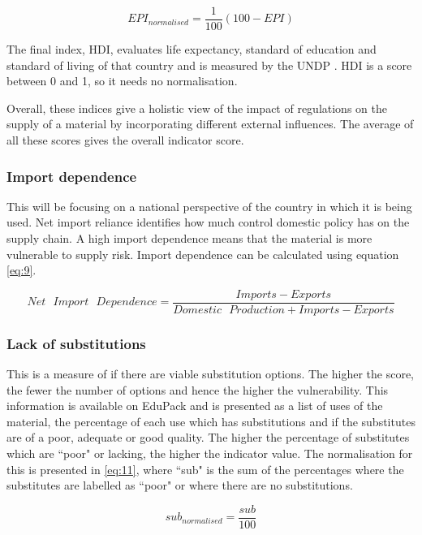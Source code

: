 \documentclass{article}
\begin{document}
\begin{equation} \label{eq:8}
EPI_{normalised} = \frac{1}{100}(100 - EPI)
\end{equation}

The final index, HDI, evaluates life expectancy, standard of education and standard of living of that country and is measured by the UNDP \cite{conceiccao2020human}. HDI is a score between 0 and 1, so it needs no normalisation. 

Overall, these indices give a holistic view of the impact of regulations on the supply of a material by incorporating different external influences. The average of all these scores gives the overall indicator score.

\subsubsection{Import dependence}

This will be focusing on a national perspective of the country in which it is being used. Net import reliance identifies how much control domestic policy has on the supply chain. A high import dependence means that the material is more vulnerable to supply risk. Import dependence can be calculated using equation \ref{eq:9}.

\begin{equation} \label{eq:9}
Net \text{ }Import \text{ }Dependence = \frac{Imports-Exports}{Domestic \text{ }Production+Imports-Exports}
\end{equation}

\subsubsection{Lack of substitutions} 

This is a measure of if there are viable substitution options. The higher the score, the fewer the number of options and hence the higher the vulnerability. This information is available on EduPack and is presented as a list of uses of the material, the percentage of each use which has substitutions and if the substitutes are of a poor, adequate or good quality. The higher the percentage of substitutes which are ``poor" or lacking, the higher the indicator value. The normalisation for this is presented in \ref{eq:11}, where ``sub" is the sum of the percentages where the substitutes are labelled as ``poor" or where there are no substitutions. 

\begin{equation} \label{eq:11}
sub_{normalised} = \frac{sub}{100}
\end{equation}
\end{document}
